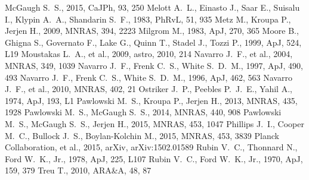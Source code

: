 \documentclass[paper=a4, fontsize=11pt]{scrartcl} %
\numberwithin{equation}{section} %
\numberwithin{figure}{section} %
\numberwithin{table}{section} %
\begin{document}
\begin{thebibliography}{}
McGaugh S.~S., 2015, CaJPh, 93, 250 
Melott A.~L., Einasto J., Saar E., Suisalu I., Klypin A.~A., Shandarin 
S.~F., 1983, PhRvL, 51, 935 
 Metz M., Kroupa P., Jerjen H., 2009, MNRAS, 394, 2223 
Milgrom M., 1983, ApJ, 270, 365 
Moore B., Ghigna S., Governato F., Lake G., Quinn T., Stadel J., Tozzi P., 
1999, ApJ, 524, L19 
 Moustakas L.~A., et al., 2009, astro, 
2010, 214 
 Navarro J.~F., et al., 2004, MNRAS, 349, 
1039
 Navarro J.~F., Frenk C.~S., White S.~D.~M., 1997, ApJ, 490, 493
 Navarro J.~F., Frenk C.~S., White S.~D.~M., 1996, ApJ, 462, 563 
 Navarro J.~F., et al., 2010, MNRAS, 402, 
21
 Ostriker J.~P., Peebles P.~J.~E., Yahil A., 1974, ApJ, 193, L1 
 Pawlowski M.~S., Kroupa P., Jerjen H., 2013, MNRAS, 435, 1928 
 Pawlowski M.~S., McGaugh S.~S., 2014, MNRAS, 440, 908 
 Pawlowski M.~S., McGaugh S.~S., Jerjen H., 2015, MNRAS, 453, 1047 
 Phillips J.~I., Cooper M.~C., Bullock 
J.~S., Boylan-Kolchin M., 2015, MNRAS, 453, 3839 
 Planck Collaboration, et al., 2015, arXiv, 
arXiv:1502.01589 
 Rubin V.~C., Thonnard N., Ford W.~K., Jr., 1978, ApJ, 225, L107 
 Rubin V.~C., Ford W.~K., Jr., 1970, ApJ, 159, 379 
 Treu T., 2010, ARA\&A, 48, 87 

\end{thebibliography}
\end{document}
